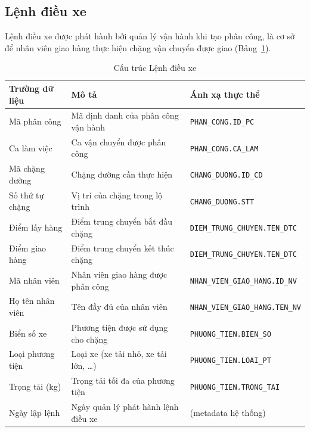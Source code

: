 \documentclass[11pt]{report}
\begin{document}
\subsection{Lệnh điều xe}
\label{subsec:lenh_dieuxe}

Lệnh điều xe được phát hành bởi quản lý vận hành khi tạo phân công, là cơ sở để nhân viên giao hàng thực hiện chặng vận chuyển được giao (Bảng~\ref{tab:lenh_dieuxe}).

\begin{table}[H]
    \centering
    \renewcommand{\tabularxcolumn}[1]{m{#1}}
    \begin{tabularx}{\textwidth}{|l|X|l|} \hline
        \rowcolor{teal!30}
        \textbf{Trường dữ liệu} & \textbf{Mô tả} & \textbf{Ánh xạ thực thể} \\ \hline
        Mã phân công     & Mã định danh của phân công vận hành      & \texttt{\footnotesize PHAN\_CONG.ID\_PC} \\ \hline
        Ca làm việc      & Ca vận chuyển được phân công             & \texttt{\footnotesize PHAN\_CONG.CA\_LAM} \\ \hline
        Mã chặng đường   & Chặng đường cần thực hiện                & \texttt{\footnotesize CHANG\_DUONG.ID\_CD} \\ \hline
        Số thứ tự chặng  & Vị trí của chặng trong lộ trình          & \texttt{\footnotesize CHANG\_DUONG.STT} \\ \hline
        Điểm lấy hàng    & Điểm trung chuyển bắt đầu chặng          & \texttt{\footnotesize DIEM\_TRUNG\_CHUYEN.TEN\_DTC} \\ \hline
        Điểm giao hàng   & Điểm trung chuyển kết thúc chặng         & \texttt{\footnotesize DIEM\_TRUNG\_CHUYEN.TEN\_DTC} \\ \hline
        Mã nhân viên     & Nhân viên giao hàng được phân công       & \texttt{\footnotesize NHAN\_VIEN\_GIAO\_HANG.ID\_NV} \\ \hline
        Họ tên nhân viên & Tên đầy đủ của nhân viên                 & \texttt{\footnotesize NHAN\_VIEN\_GIAO\_HANG.TEN\_NV} \\ \hline
        Biển số xe       & Phương tiện được sử dụng cho chặng       & \texttt{\footnotesize PHUONG\_TIEN.BIEN\_SO} \\ \hline
        Loại phương tiện & Loại xe (xe tải nhỏ, xe tải lớn, \ldots) & \texttt{\footnotesize PHUONG\_TIEN.LOAI\_PT} \\ \hline
        Trọng tải (kg)   & Trọng tải tối đa của phương tiện         & \texttt{\footnotesize PHUONG\_TIEN.TRONG\_TAI} \\ \hline
        Ngày lập lệnh    & Ngày quản lý phát hành lệnh điều xe      & (metadata hệ thống) \\ \hline
    \end{tabularx}
    \caption{Cấu trúc Lệnh điều xe}
    \label{tab:lenh_dieuxe}
\end{table}
\end{document}
